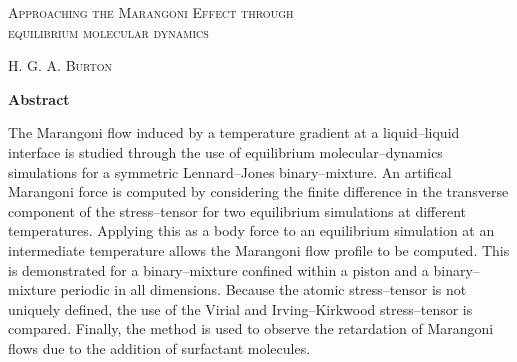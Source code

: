 \thispagestyle{plain}
\begin{center}
\textsc{\Large Approaching the Marangoni Effect through\\ equilibrium molecular dynamics}

    \vspace{0.2cm}
    \normalsize{{\textsc{H. G. A. Burton}}}
    
\vspace{0.2cm}
    \normalsize{\textbf{Abstract}}
\end{center}
The Marangoni flow induced by a temperature gradient at a liquid--liquid interface is studied through the use of equilibrium molecular--dynamics simulations for a symmetric Lennard--Jones binary--mixture.
An artifical Marangoni force is computed by considering the finite difference in the transverse component of the stress--tensor for two equilibrium simulations at different temperatures.
Applying this as a body force to an equilibrium simulation at an intermediate temperature allows the Marangoni flow profile to be computed.
This is demonstrated for a binary--mixture confined within a piston and a binary--mixture periodic in all dimensions. Because the atomic stress--tensor is not uniquely defined, the use of the Virial and Irving--Kirkwood stress--tensor is compared.
Finally, the method is used to observe the retardation of Marangoni flows due to the addition of surfactant molecules.

